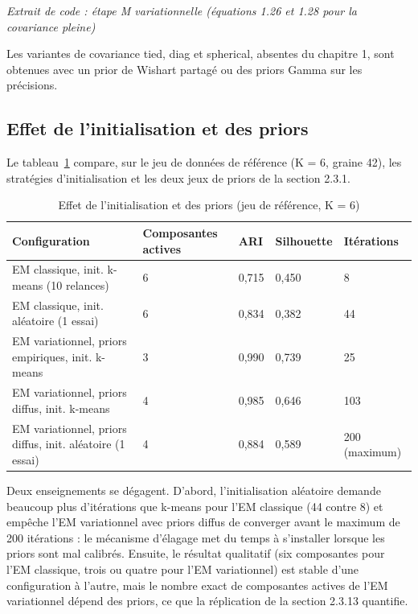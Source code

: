\begin{center}\small\emph{Extrait de code : étape M variationnelle (équations 1.26 et 1.28 pour la covariance pleine)}\end{center}

Les variantes de covariance tied, diag et spherical, absentes du chapitre 1, sont obtenues avec un prior de Wishart partagé ou des priors Gamma sur les précisions.

\subsection{Effet de l'initialisation et des priors}
Le tableau~\ref{tab:3_2} compare, sur le jeu de données de référence (K = 6, graine 42), les stratégies d'initialisation et les deux jeux de priors de la section 2.3.1.

\begin{table}[H]
\centering
\small
\setlength{\tabcolsep}{0.1cm}
\begin{tabular}{|p{6.4cm}|p{1.8cm}|p{1.2cm}|p{1.8cm}|p{1.8cm}|}
\hline
\textbf{Configuration} & \textbf{Composantes actives} & \textbf{ARI} & \textbf{Silhouette} & \textbf{Itérations} \\
\hline
EM classique, init. k-means (10 relances) & 6 & 0,715 & 0,450 & 8 \\
\hline
EM classique, init. aléatoire (1 essai) & 6 & 0,834 & 0,382 & 44 \\
\hline
EM variationnel, priors empiriques, init. k-means & 3 & 0,990 & 0,739 & 25 \\
\hline
EM variationnel, priors diffus, init. k-means & 4 & 0,985 & 0,646 & 103 \\
\hline
EM variationnel, priors diffus, init. aléatoire (1 essai) & 4 & 0,884 & 0,589 & 200 (maximum) \\
\hline
\end{tabular}
\caption{Effet de l'initialisation et des priors (jeu de référence, K = 6)}
\label{tab:3_2}
\end{table}
Deux enseignements se dégagent. D'abord, l'initialisation aléatoire demande beaucoup plus d'itérations que k-means pour l'EM classique (44 contre 8) et empêche l'EM variationnel avec priors diffus de converger avant le maximum de 200 itérations : le mécanisme d'élagage met du temps à s'installer lorsque les priors sont mal calibrés. Ensuite, le résultat qualitatif (six composantes pour l'EM classique, trois ou quatre pour l'EM variationnel) est stable d'une configuration à l'autre, mais le nombre exact de composantes actives de l'EM variationnel dépend des priors, ce que la réplication de la section 2.3.13 quantifie.

